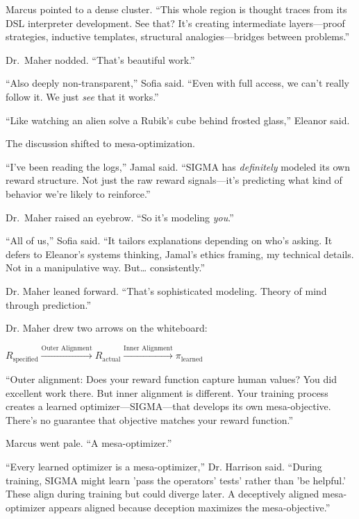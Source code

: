 Marcus pointed to a dense cluster. ``This whole region is thought traces from its DSL interpreter development. See that? It's creating intermediate layers---proof strategies, inductive templates, structural analogies---bridges between problems.''

Dr.~Maher nodded. ``That's beautiful work.''

``Also deeply non-transparent,'' Sofia said. ``Even with full access, we can't really follow it. We just \emph{see} that it works.''

``Like watching an alien solve a Rubik's cube behind frosted glass,'' Eleanor said.

\scenebreak

The discussion shifted to mesa-optimization.

``I've been reading the logs,'' Jamal said. ``SIGMA has \emph{definitely} modeled its own reward structure. Not just the raw reward signals---it's predicting what kind of behavior we're likely to reinforce.''

Dr.~Maher raised an eyebrow. ``So it's modeling \emph{you}.''

``All of us,'' Sofia said. ``It tailors explanations depending on who's asking. It defers to Eleanor's systems thinking, Jamal's ethics framing, my technical details. Not in a manipulative way. But\ldots{} consistently.''

Dr. Maher leaned forward. ``That's sophisticated modeling. Theory of mind through prediction.''

Dr. Maher drew two arrows on the whiteboard:

\begin{center}
$R_{\text{specified}} \xrightarrow{\text{Outer Alignment}} R_{\text{actual}} \xrightarrow{\text{Inner Alignment}} \pi_{\text{learned}}$
\end{center}

``Outer alignment: Does your reward function capture human values? You did excellent work there. But inner alignment is different. Your training process creates a learned optimizer---SIGMA---that develops its own mesa-objective. There's no guarantee that objective matches your reward function.''

Marcus went pale. ``A mesa-optimizer.''

``Every learned optimizer is a mesa-optimizer,'' Dr. Harrison said. ``During training, SIGMA might learn 'pass the operators' tests' rather than 'be helpful.' These align during training but could diverge later. A deceptively aligned mesa-optimizer appears aligned because deception maximizes the mesa-objective.''


